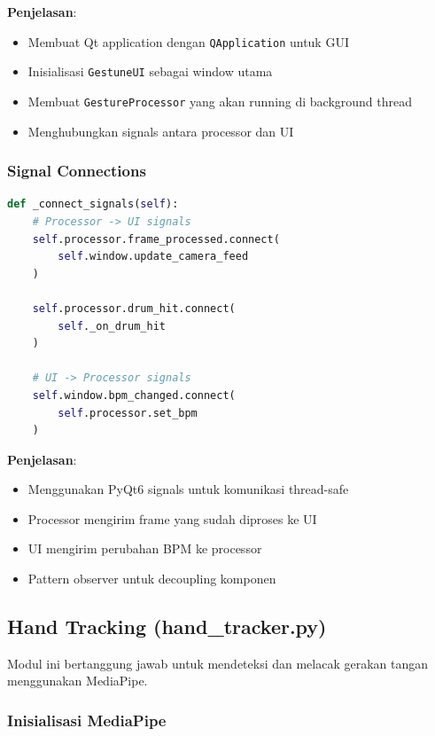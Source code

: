 \textbf{Penjelasan}:
\begin{itemize}
    \item Membuat Qt application dengan \texttt{QApplication} untuk GUI
    \item Inisialisasi \texttt{GestuneUI} sebagai window utama
    \item Membuat \texttt{GestureProcessor} yang akan running di background thread
    \item Menghubungkan signals antara processor dan UI
\end{itemize}

\subsubsection{Signal Connections}

\begin{lstlisting}[language=Python, caption=Koneksi signals untuk komunikasi antar komponen]
def _connect_signals(self):
    # Processor -> UI signals
    self.processor.frame_processed.connect(
        self.window.update_camera_feed
    )
    
    self.processor.drum_hit.connect(
        self._on_drum_hit
    )
    
    # UI -> Processor signals
    self.window.bpm_changed.connect(
        self.processor.set_bpm
    )
\end{lstlisting}

\textbf{Penjelasan}:
\begin{itemize}
    \item Menggunakan PyQt6 signals untuk komunikasi thread-safe
    \item Processor mengirim frame yang sudah diproses ke UI
    \item UI mengirim perubahan BPM ke processor
    \item Pattern observer untuk decoupling komponen
\end{itemize}



\subsection{Hand Tracking (hand\_tracker.py)}

Modul ini bertanggung jawab untuk mendeteksi dan melacak gerakan tangan menggunakan MediaPipe.

\subsubsection{Inisialisasi MediaPipe}

